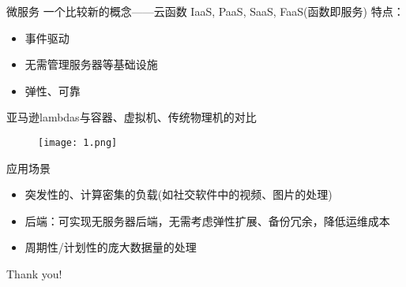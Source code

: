 \documentclass{beamer}
\begin{document}
    \begin{frame}微服务
        一个比较新的概念——云函数
        IaaS, PaaS, SaaS, FaaS(函数即服务)
        特点：
        \begin{itemize}
        	\item 事件驱动
        	\item 无需管理服务器等基础设施
        	\item 弹性、可靠
        \end{itemize}        
    \end{frame}

    \begin{frame}
        亚马逊lambdas与容器、虚拟机、传统物理机的对比
        \begin{figure}
        	\centering
            \texttt{[image: 1.png]}
        \end{figure}
        
    \end{frame}

    \begin{frame}应用场景
    	\begin{itemize}
    		\item 突发性的、计算密集的负载(如社交软件中的视频、图片的处理)
    		\item 后端：可实现无服务器后端，无需考虑弹性扩展、备份冗余，降低运维成本
    		\item 周期性/计划性的庞大数据量的处理
    		
    	\end{itemize}
    
    \end{frame}

    \begin{frame}
        \centering Thank you!
    \end{frame}
\end{document}

